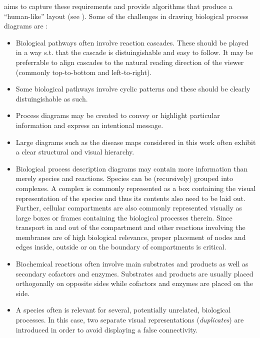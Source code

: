 \documentclass[
	fontsize=10pt, %
	twoside=false, %
	secnumdepth=1, %
]{kaobook}
\begin{document}
aims to capture these requirements and provide algorithms that produce a
``human-like'' layout (see ). Some of the challenges
in drawing biological process diagrams are
\cite{bourqui_MetabolicNetworkVisualization_2007}
\cite{siebenhaller_HumanlikeLayoutAlgorithms_2020}
\cite{wu_MetabopolisScalableNetwork_2019} :
\begin{itemize}
\item Biological pathways often involve reaction cascades. These should be
  played in a way s.t. that the cascade is distuingishable and easy to follow.
  It may be preferrable to align cascades to the natural reading direction of
  the viewer (commonly top-to-bottom and left-to-right).
 \item Some biological pathways involve cyclic patterns and these should be
   clearly distuingishable as such.
\item Process diagrams may be created to convey or highlight particular
  information and express an intentional message.
 \item Large diagrams such as the disease maps considered in this work often
   exhibit a clear structural and visual hierarchy.
\item Biological process description diagrams may contain more information
  than merely species and reactions. Species can be (recursively) grouped
  into complexes. A complex is commonly represented as a box containing the
  visual representation of the species and thus its contents also need to be
  laid out. Further, cellular compartments are also commonly represented
  visually as large boxes or frames containing the biological processes
  therein. Since transport in and out of the compartment and other reactions
  involving the membranes are of high biological relevance, proper placement
  of nodes and edges inside, outside or on the boundary of compartments is critical.
\item Biochemical reactions often involve main substrates and products as well
  as secondary cofactors and enzymes. Substrates and products are usually
  placed orthogonally on opposite sides while cofactors and enzymes are
  placed on the side.
\item A species often is relevant for several, potentially unrelated, biological
  processes. In this case, two separate visual representations
  (\textit{duplicates}) are introduced in
  order to avoid displaying a false connectivity.
\end{itemize}
\end{document}
